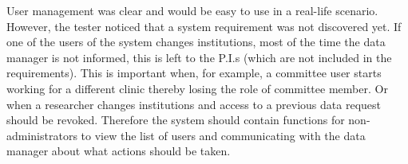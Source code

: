 User management was clear and would be easy to use in a real-life scenario.
However, the tester noticed that a system requirement was not discovered yet.
If one of the users of the system changes institutions, most of the time the data manager is not informed, this is left to the P.I.s (which are not included in the \ivfsystem{} requirements).
This is important when, for example, a committee user starts working for a different clinic thereby losing the role of committee member.
Or when a researcher changes institutions and access to a previous data request should be revoked.
Therefore the system should contain functions for non-administrators to view the list of users and communicating with the data manager about what actions should be taken.